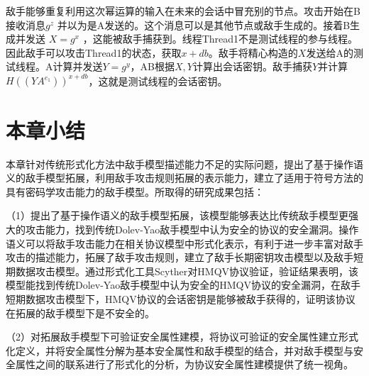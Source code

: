 敌手能够重复利用这次幂运算的输入在未来的会话中冒充别的节点。攻击开始在B接收消息$g^z$ 并以为是A发送的。这个消息可以是其他节点或敌手生成的。接着B生成并发送 $X=g^x$ ，这能被敌手捕获到。线程Thread1不是测试线程的参与线程。因此敌手可以攻击Thread1的状态，获取$x+db$。敌手将精心构造的$X$发送给A的测试线程。A计算并发送$Y=g^y$，AB根据$X,Y$计算出会话密钥。敌手捕获$Y$并计算$H((YA^{e_1} ))^{x+db}$，这就是测试线程的会话密钥。

\section{本章小结}
本章针对传统形式化方法中敌手模型描述能力不足的实际问题，提出了基于操作语义的敌手模型拓展，利用敌手攻击规则拓展的表示能力，建立了适用于符号方法的具有密码学攻击能力的敌手模型。所取得的研究成果包括：

（1）提出了基于操作语义的敌手模型拓展，该模型能够表达比传统敌手模型更强大的攻击能力，找到传统Dolev-Yao敌手模型中认为安全的协议的安全漏洞。操作语义可以将敌手攻击能力在相关协议模型中形式化表示，有利于进一步丰富对敌手攻击的描述能力，拓展了敌手攻击规则，建立了敌手长期密钥攻击模型以及敌手短期数据攻击模型。通过形式化工具Scyther对HMQV协议验证，验证结果表明，该模型能找到传统Dolev-Yao敌手模型中认为安全的HMQV协议的安全漏洞，在敌手短期数据攻击模型下，HMQV协议的会话密钥是能够被敌手获得的，证明该协议在拓展的敌手模型下是不安全的。

（2）对拓展敌手模型下可验证安全属性建模，将协议可验证的安全属性建立形式化定义，并将安全属性分解为基本安全属性和敌手模型的结合，并对敌手模型与安全属性之间的联系进行了形式化的分析，为协议安全属性建模提供了统一视角。

